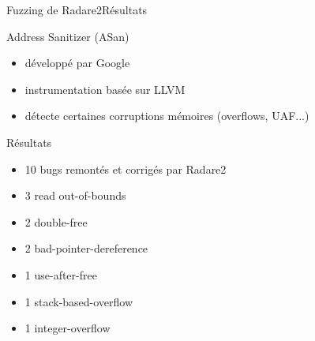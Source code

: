 \begin{frame}{Fuzzing de Radare2}{Résultats}
  \begin{exampleblock}{Address Sanitizer (ASan)}
    \begin{itemize}
    \item{développé par Google}
    \item{instrumentation basée sur LLVM}
    \item{détecte certaines corruptions mémoires (overflows, UAF...)}
    \end{itemize}
  \end{exampleblock}

  \pause

  \begin{block}{Résultats}
    \begin{itemize}
    \item{10 bugs remontés et corrigés par Radare2}
    \item{3 read out-of-bounds}
    \item{2 double-free}
    \item{2 bad-pointer-dereference}
    \item{1 use-after-free}
    \item{1 stack-based-overflow}
    \item{1 integer-overflow}
    \end{itemize}
  \end{block}
\end{frame}
